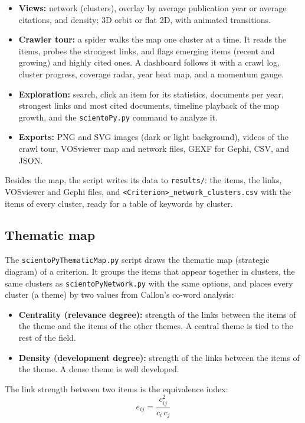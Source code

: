 \documentclass[10pt,letterpaper]{article}
\begin{document}
\begin{itemize}
\item \textbf{Views:} network (clusters), overlay by average publication year or average citations, and density; 3D orbit or flat 2D, with animated transitions.
\item \textbf{Crawler tour:} a spider walks the map one cluster at a time. It reads the items, probes the strongest links, and flags emerging items (recent and growing) and highly cited ones. A dashboard follows it with a crawl log, cluster progress, coverage radar, year heat map, and a momentum gauge.
\item \textbf{Exploration:} search, click an item for its statistics, documents per year, strongest links and most cited documents, timeline playback of the map growth, and the \verb|scientoPy.py| command to analyze it.
\item \textbf{Exports:} PNG and SVG images (dark or light background), videos of the crawl tour, VOSviewer map and network files, GEXF for Gephi, CSV, and JSON.
\end{itemize}

Besides the map, the script writes its data to \verb|results/|: the items, the links, VOSviewer and Gephi files, and \verb|<Criterion>_network_clusters.csv| with the items of every cluster, ready for a table of keywords by cluster.

\subsection{Thematic map}
\label{sec_thematic_map}

The \verb|scientoPyThematicMap.py| script draws the thematic map (strategic diagram) of a criterion. It groups the items that appear together in clusters, the same clusters as \verb|scientoPyNetwork.py| with the same options, and places every cluster (a theme) by two values from Callon's co-word analysis:

\begin{itemize}
\item \textbf{Centrality (relevance degree):} strength of the links between the items of the theme and the items of the other themes. A central theme is tied to the rest of the field.
\item \textbf{Density (development degree):} strength of the links between the items of the theme. A dense theme is well developed.
\end{itemize}

The link strength between two items is the equivalence index:
\begin{equation}
e_{ij} = \frac{c_{ij}^2}{c_i \, c_j}
\label{equation_equivalence}
\end{equation}
\end{document}
